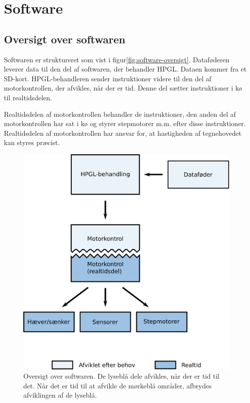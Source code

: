 \chapter[Implementering af software]{Software}



\section{Oversigt over softwaren}


Softwaren er struktureret som vist i
figur\vref{fig:software-oversigt}. Dataføderen leverer data til den
del af softwaren, der behandler HPGL. Dataen kommer fra et
SD-kort. HPGL-behandleren sender instruktioner videre til den del af
motorkontrollen, der afvikles, når der er tid. Denne del sætter
instruktioner i kø til realtidsdelen.

Realtidsdelen af motorkontrollen behandler de instruktioner, den anden
del af motorkontrollen har sat i kø og styrer stepmotorer m.m. efter
disse instruktioner. Realtidsdelen af motorkontrollen har ansvar for,
at hastigheden af tegnehovedet kan styres præcist.


\begin{figure}[htbp]
  \centering
  \includegraphics[width=.75\textwidth]{../brugere/kjaergaard/software-oversigt}
  \caption{Oversigt over softwaren. De lyseblå dele afvikles, når der
    er tid til det. Når det er tid til at afvikle de mørkeblå områder,
    afbrydes afviklingen af de lyseblå.}
  \label{fig:software-oversigt}
\end{figure}


